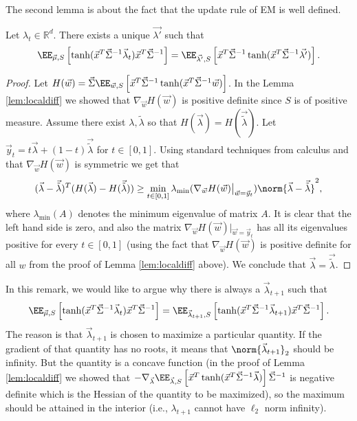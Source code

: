 The second lemma is about the fact that the update rule of EM is well defined.
\begin{lemma}\label{lem:welldefined} Let $\lambda_t \in \mathbb{R}^d$. There exists a unique $\vec{\lambda'}$ such that
\[
\EE_{\vec{\mu},S}\left[\tanh(\vec{x}^T\vec{\Sigma}^{-1}\vec{\lambda}_t)\vec{x}^T\vec{\Sigma}^{-1}\right]=\EE_{\vec{\lambda'},S}\left[\vec{x}^T\vec{\Sigma}^{-1}\tanh(\vec{x}^T\vec{\Sigma}^{-1}\vec{\lambda'})\right].
\]
\end{lemma}

\begin{proof}
	
	Let $H(\vec{w}) = \vec{\Sigma}\EE_{\vec{w},S}\left[\vec{x}^T\vec{\Sigma}^{-1}\tanh(\vec{x}^T\vec{\Sigma}^{-1}\vec{w})\right]$. In the Lemma \ref{lem:localdiff} we showed that $\nabla_{\vec{w}}  H(\vec{w})$ is positive definite since $S$ is of positive measure.
	Assume there exist $\lambda, \tilde{\lambda}$ so that $H(\vec{\lambda}) = H(\vec{\tilde{\lambda}})$. Let $\vec{y}_t = t \vec{\lambda} + (1-t) \vec{\tilde{\lambda}}$ for $t \in [0,1]$. Using standard techniques from calculus and that $\nabla_{\vec{w}}  H(\vec{w})$ is symmetric we get that
	\begin{equation}
		(\vec{\lambda} - \vec{\tilde{\lambda}})^T (H(\vec{\lambda}) - H(\vec{\tilde{\lambda}})) \geq \min_{t \in [0,1]}\lambda_{\min} (\nabla_{\vec{w}}  H(\vec{w}) \big\vert_{\vec{w} = \vec{y}_t}) \norm{\vec{\lambda} - \vec{\tilde{\lambda}}}^2,
	\end{equation}
	where $\lambda_{\min}(A)$ denotes the minimum eigenvalue of matrix $A$. It is clear that the left hand side is zero, and also the matrix $\nabla_{\vec{w}}  H(\vec{w}) \big\vert_{\vec{w} = \vec{y}_t}$ has all its eigenvalues positive for every $t \in [0,1]$ (using the fact that $\nabla_{\vec{w}}  H(\vec{w})$ is positive definite for all $w$ from the proof of Lemma \ref{lem:localdiff} above). We conclude that $\vec{\lambda} = \vec{\tilde{\lambda}}$.
	
\end{proof}

\begin{remark} In this remark, we would like to argue why there is always a $\vec{\lambda}_{t+1}$ such that \[
\EE_{\vec{\mu},S}\left[\tanh(\vec{x}^T\vec{\Sigma}^{-1}\vec{\lambda}_t)\vec{x}^T\vec{\Sigma}^{-1}\right]=\EE_{\vec{\lambda}_{t+1},S}\left[\tanh(\vec{x}^T\vec{\Sigma}^{-1}\vec{\lambda}_{t+1})\vec{x}^T\vec{\Sigma}^{-1}\right].
\]
The reason is that $\vec{\lambda}_{t+1}$ is chosen to maximize a particular quantity. If the gradient of that quantity has no roots, it means that $\norm{\vec{\lambda}_{t+1}}_2$ should be infinity. But the quantity is a concave function (in the proof of Lemma \ref{lem:localdiff} we showed that $- \nabla_{\vec{\lambda}} \EE_{\vec{\lambda},S}\left[\vec{x}^T\tanh(\vec{x}^T\vec{\Sigma}^{-1}\vec{\lambda})\right]\vec{\Sigma}^{-1}$ is negative definite which is the Hessian of the quantity to be maximized), so the maximum should be attained in the interior (i.e., $\lambda_{t+1}$ cannot have $\ell_2$ norm infinity).
\end{remark}
